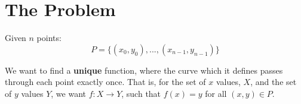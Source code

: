 \documentclass{article}
\begin{document}
    \section{The Problem}
    
    Given $n$ points: $$P = \{(x_0, y_0), ..., (x_{n - 1}, y_{n - 1})\}$$

    We want to find a \textbf{unique} function, where the curve which it defines passes through each point exactly once. That is, for the set of $x$ values, $X$, and the set of $y$ values $Y$, we want $f: X \to Y$, such that $f(x) = y$ for all $(x, y) \in P$.
\end{document}
